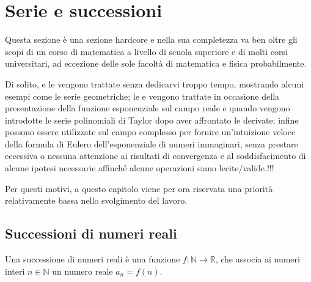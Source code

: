\documentclass[letterpaper,10pt,italian]{jupyterBook}
\begin{document}
\chapter{Serie e successioni}
\label{\detokenize{ch/series:serie-e-successioni}}\label{\detokenize{ch/series:math-hs-series}}\label{\detokenize{ch/series::doc}}
\sphinxAtStartPar
Questa sezione è una sezione hard\sphinxhyphen{}core e nella sua completezza va ben oltre gli scopi di un corso di matematica a livello di scuola superiore e di molti corsi universitari, ad eccezione delle sole facoltà di matematica e fisica probabilmente.

\sphinxAtStartPar
Di solito, {\hyperref[\detokenize{ch/series:math-hs-series-real-sequences}]{}} e le {\hyperref[\detokenize{ch/series:math-hs-series-real-series}]{}} vengono trattate senza dedicarvi troppo tempo, mostrando alcuni esempi come le serie geometriche; le {\hyperref[\detokenize{ch/series:math-hs-series-fun-sequences}]{}} e {\hyperref[\detokenize{ch/series:math-hs-series-fun-series}]{}} vengono trattate in occasione della presentazione della funzione esponenziale sul campo reale e quando vengono introdotte le serie polinomiali di Taylor dopo aver affrontato le derivate; infine possono essere utilizzate sul campo complesso per fornire un’intuizione veloce della formula di Eulero dell’esponenziale di numeri immaginari, senza prestare eccessiva \sphinxhyphen{} o nessuna \sphinxhyphen{} attenzione ai risultati di convergenza e al soddisfacimento di alcune ipotesi necessarie affinché alcune operazioni siano lecite/valide.!!!

\sphinxAtStartPar
Per questi motivi, a questo capitolo viene per ora riservata una priorità relativamente bassa nello svolgimento del lavoro.


\section{Successioni di numeri reali}
\label{\detokenize{ch/series:successioni-di-numeri-reali}}\label{\detokenize{ch/series:math-hs-series-real-sequences}}
\sphinxAtStartPar
{} Una successione di numeri reali è una funzione \(f: \mathbb{N} \rightarrow \mathbb{R}\), che associa ai numeri interi \(n \in \mathbb{N}\) un numero reale \(a_n = f(n)\).
\end{document}
